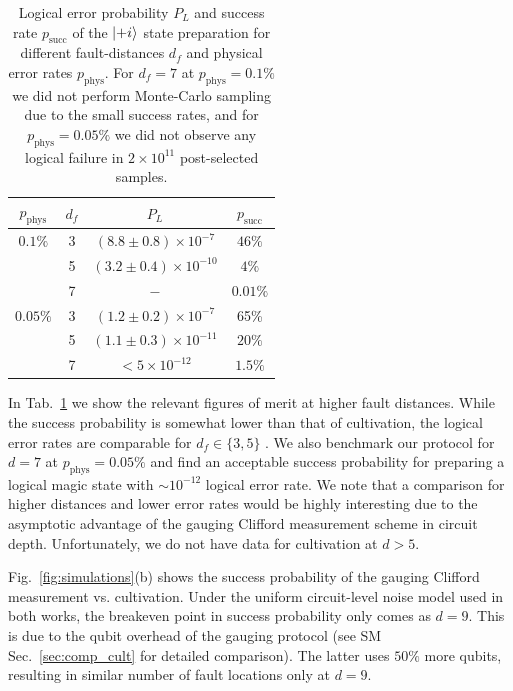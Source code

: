 \documentclass[aps,prx,twocolumn,secnumarabic,superscriptaddress,nofootinbib]{revtex4-2}
\begin{document}
\begin{table}[b]
    \centering
    \begin{tabular}{cccc}
        \hline
        $p_\text{phys}$ & $d_f$ & $P_L$ & $p_\text{succ}$ \\        
        \hline
        $0.1\%$ & 3 & $(8.8\pm 0.8) \times 10^{-7}$ & $46\%$\\
         & 5 & $(3.2\pm 0.4) \times 10^{-10}$ & $4\%$\\
         & 7 & $-$ & $0.01\%$\\
        \hline
        $0.05\%$ & 3 & $(1.2\pm 0.2)\times 10^{-7}$ & 65\%\\
         & 5 & $(1.1\pm 0.3)\times 10^{-11}$ & $20\%$\\
         & 7 & $<5\times 10^{-12}$ & $1.5\%$\\
        \hline
    \end{tabular}
    \caption{Logical error probability $P_L$ and success rate $p_\text{succ}$ of the $\ket{+i}$ state preparation for different fault-distances $d_f$ and physical error rates $p_\text{phys}$. For $d_f=7$ at $p_\text{phys} = 0.1\%$ we did not perform Monte-Carlo sampling due to the small success rates, and for $p_\text{phys} = 0.05\%$ we did not observe any logical failure in $2\times10^{11}$ post-selected samples. }
    \label{tab:simulation}
\end{table}


In Tab.~\ref{tab:simulation} we show the relevant figures of merit at higher fault distances. While the success probability is somewhat lower than that of cultivation, the logical error rates are comparable for $d_f\in\{3,5\}$ \cite{gidneyMagicStateCultivation2024}. We also benchmark our protocol for $d=7$ at $p_\text{phys} = 0.05\%$ and find an acceptable success probability for preparing a logical magic state with $\sim10^{-12}$ logical error rate. We note that a comparison for higher distances and lower error rates would be highly interesting due to the asymptotic advantage of the gauging Clifford measurement scheme in circuit depth. Unfortunately, we do not have data for cultivation at $d>5$.

Fig.~\ref{fig:simulations}(b) shows the success probability of the gauging Clifford measurement vs. cultivation. %
Under the uniform circuit-level noise model used in both works, the breakeven point in success probability only comes as $d=9$. This is due to the qubit overhead of the gauging protocol (see SM Sec.~\ref{sec:comp_cult} for detailed comparison). The latter uses $50\%$ more qubits, resulting in similar number of fault locations only at $d=9$. 
\end{document}
